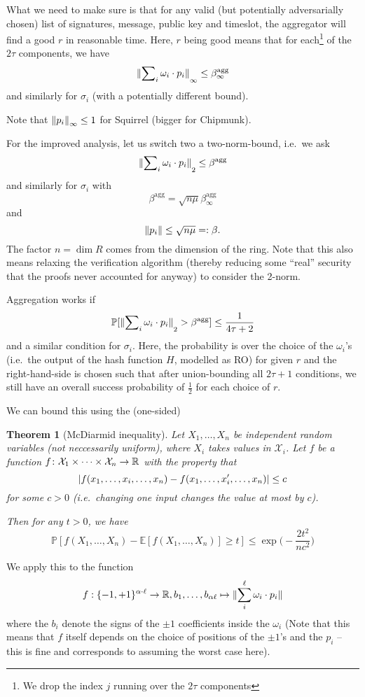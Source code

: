 \documentclass{article}
\newtheorem{theorem}{Theorem}
\renewcommand{\PROB}{\mathbb{P}}
\renewcommand{\EXPECT}{\mathbb{E}}
\newcommand{\CHI}{\mathcal{X}}
\begin{document}
What we need to make sure is that for any valid (but potentially adversarially chosen) list of signatures, message, public key and timeslot, the aggregator will find a good $r$ in reasonable time. Here, $r$ being good means that for each\footnote{We drop the index $j$ running over the $2\tau$ components} of the $2\tau$ components, we have
\[
 {\lVert{ \sum\nolimits_i  \omega_i \cdot p_i}\rVert}_{\infty} \leq \beta^{\textrm{agg}}_{\infty}
\]
and similarly for $\sigma_i$ (with a potentially different bound).

Note that ${\lVert{p_i}\rVert}_{\infty} \leq 1$ for Squirrel (bigger for Chipmunk).

For the improved analysis, let us switch two a two-norm-bound, i.e.\ we ask
\[
  {\lVert{\sum\nolimits_i \omega_i \cdot p_i}\rVert}_{2} \leq \beta^{\textrm{agg}}
\]
and similarly for $\sigma_i$
with \[
\beta^{\textrm{agg}} = \sqrt{n \mu} \beta^{\textrm{agg}}_{\infty}
\] and \[{\lVert{p_i}\rVert} \leq \sqrt{n \mu} =: \beta.\] The factor $n=\dim R$ comes from the dimension of the ring. Note that this also means relaxing the verification algorithm (thereby reducing some ``real'' security that the proofs never accounted for anyway) to consider the 2-norm.

Aggregation works if
\[
    \PROB[\norm{\sum\nolimits_i \omega_i \cdot p_i}_{2} > \beta^{\textrm{agg}}] \leq \frac{1}{4\tau +2}
\]
and a similar condition for $\sigma_i$.
Here, the probability is over the choice of the $\omega_i$'s (i.e.\ the output of the hash function $H$, modelled as RO) for given $r$ and the right-hand-side is chosen such that after union-bounding all $2\tau + 1$ conditions, we still have an overall success probability of $\tfrac{1}{2}$ for each choice of $r$.

We can bound this using the (one-sided)
\begin{theorem}[McDiarmid inequality]
Let $X_1,\ldots, X_n$ be independent random variables (not neccessarily uniform), where $X_i$ takes values in $\CHI_i$. Let $f$ be a function
$f\colon \CHI_1\times\dots\times \CHI_n \to \IR$ with the property that
\[
 {\lvert{f(x_1,\ldots, x_i,\ldots, x_n) - f(x_1,\ldots, x'_i,\ldots, x_n)}\rvert} \leq c
\]
for some $c>0$ (i.e.\ changing \emph{one} input changes the value at most by $c$).

Then for any $t>0$, we have
\[
  \PROB[f(X_1,\ldots,X_n) - \EXPECT[f(X_1,\ldots,X_n)] \geq t] \leq \mathop{exp}\bigl(-\frac{2t^2}{nc^2}\bigr)
\]
\end{theorem}

We apply this to the function
\[
 f:\{-1,+1\}^{\alpha\cdot \ell} \to {\mathbb{R}}, b_1,\ldots,b_{\alpha\ell} \mapsto {\lVert{\sum_i^{\ell} \omega_i \cdot p_i}\rVert}
\]
where the $b_i$ denote the signs of the $\pm 1$ coefficients inside the $\omega_i$ (Note that this means that $f$ itself depends on the choice of positions of the $\pm 1$'s and the $p_i$ -- this is fine and corresponds to assuming the worst case here).
\end{document}
